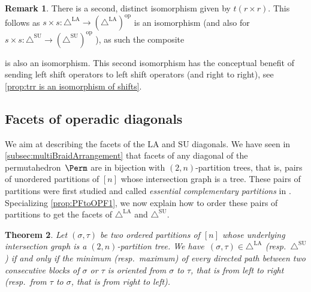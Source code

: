 \documentclass{amsart}
\newcommand{\darkblue}{\color{darkblue}} %
\newtheorem{theorem}{Theorem}[section]
\theoremstyle{definition}
\newtheorem{remark}[theorem]{Remark}
\newcommand{\resp}{\textit{resp.}~} %
\newcommand{\defn}[1]{\textsl{\darkblue #1}} %
\newcommand{\SU}{\mathrm{SU}}
\newcommand{\LA}{\mathrm{LA}}
\newcommand{\SUD}{\triangle^{\mathrm{SU}}}
\newcommand{\LAD}{\triangle^{\mathrm{LA}}}
\newcommand{\op}{\mathrm{op}}
\begin{document}
\begin{remark} \label{rem:Alternate Isomorphism}
There is a second, distinct isomorphism given by $t(r\times r)$.
This follows as $s\times s:\LAD \to (\LAD)^{\op}$ is an isomorphism (and also for  $s\times s:\SUD \to (\SUD)^{\op}$ ), as such the composite 
\begin{center}
\end{center}
is also an isomorphism.
This second isomorphism has the conceptual benefit of sending left shift operators to left shift operators (and right to right), see \cref{prop:trr is an isomorphism of shifts}.
\end{remark}


\subsection{Facets of operadic diagonals}
\label{subsec:facets-operadic-diags}

We aim at describing the facets of the $\LA$ and $\SU$ diagonals. 
We have seen in \cref{subsec:multiBraidArrangement} that facets of any diagonal of the permutahedron~$\Perm$ are in bijection with $(2,n)$-partition trees, that is, pairs of unordered partitions of $[n]$ whose intersection graph is a tree.
These pairs of partitions were first studied and called \defn{essential complementary partitions} in \cite{Chen, ChenGoyal, KajitaniUenoChen}.
Specializing \cref{prop:PFtoOPF1}, we now explain how to order these pairs of partitions to get the facets of $\LAD$ and $\SUD$. 

\begin{theorem}
\label{thm:facet-ordering}
Let $(\sigma,\tau)$ be two ordered partitions of $[n]$ whose underlying intersection graph is a $(2,n)$-partition tree.
We have~$(\sigma,\tau) \in \LAD$ (\resp $\SUD$) if and only if the minimum (\resp maximum) of every directed path between two consecutive blocks of $\sigma$ or $\tau$ is oriented from $\sigma$ to $\tau$, that is from left to right (\resp from $\tau$ to $\sigma$, that is from right to left).
\end{theorem}
\end{document}
